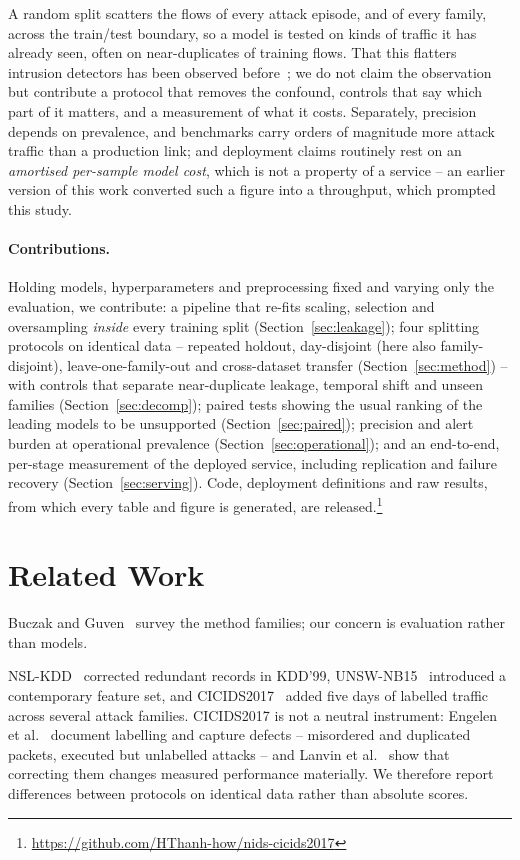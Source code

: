 \documentclass{llncs}
\begin{document}
A random split scatters the flows of every attack episode, and of every
family, across the train/test boundary, so a model is tested on kinds of
traffic it has already seen, often on near-duplicates of training flows. That
this flatters intrusion detectors has been observed
before~\cite{moczkodan2026transformers,xu2025robust}; we do not claim the
observation but contribute a protocol that removes the confound, controls
that say which part of it matters, and a measurement of what it costs.
Separately, precision depends on prevalence, and benchmarks carry orders of
magnitude more attack traffic than a production link; and deployment claims
routinely rest on an \emph{amortised per-sample model cost}, which is not a
property of a service -- an earlier version of this work converted such a
figure into a throughput, which prompted this study.

\paragraph{Contributions.}
Holding models, hyperparameters and preprocessing fixed and varying only the
evaluation, we contribute: a pipeline that re-fits scaling, selection and
oversampling \emph{inside} every training split (Section~\ref{sec:leakage});
four splitting protocols on identical data -- repeated holdout, day-disjoint
(here also family-disjoint), leave-one-family-out and cross-dataset transfer
(Section~\ref{sec:method}) -- with controls that separate near-duplicate
leakage, temporal shift and unseen families (Section~\ref{sec:decomp});
paired tests showing the usual ranking of the leading models to be
unsupported (Section~\ref{sec:paired}); precision and alert burden at
operational prevalence (Section~\ref{sec:operational}); and an end-to-end,
per-stage measurement of the deployed service, including replication and
failure recovery (Section~\ref{sec:serving}). Code, deployment definitions
and raw results, from which every table and figure is generated, are
released.\footnote{\url{https://github.com/HThanh-how/nids-cicids2017}}

\section{Related Work}
\label{sec:related}
Buczak and Guven~\cite{buczak2016survey} survey the method families; our
concern is evaluation rather than models.

NSL-KDD~\cite{tavallaee2009nslkdd} corrected redundant records in KDD'99,
UNSW-NB15~\cite{moustafa2015unswnb15} introduced a contemporary feature set,
and CICIDS2017~\cite{sharafaldin2018cicids} added five days of labelled
traffic across several attack families. CICIDS2017 is not a neutral
instrument: Engelen et al.~\cite{engelen2021troubleshooting} document
labelling and capture defects -- misordered and duplicated packets, executed
but unlabelled attacks -- and Lanvin et al.~\cite{lanvin2023errors} show that
correcting them changes measured performance materially. We therefore report
differences between protocols on identical data rather than absolute scores.
\end{document}
